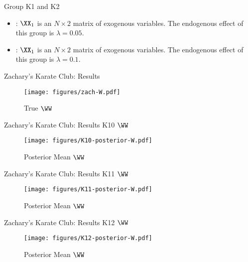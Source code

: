 \documentclass{beamer}
\begin{document}
\begin{frame}{Group K1 and K2}
	\begin{itemize}
		\item{}:
			$\XX_1$ is an $N\times 2$ matrix of exogenous variables.
			The endogenous effect of this group is $\lambda=0.05$.
		\item{}:
			$\XX_1$ is an $N\times 2$ matrix of exogenous variables.
			The endogenous effect of this group is $\lambda=0.1$.
	\end{itemize}
\end{frame}

\begin{frame}{Zachary's Karate Club: Results}
	\begin{figure}[H]
		\centering
		\texttt{[image: figures/zach-W.pdf]}
		\caption{True $\WW$}
	\end{figure}
\end{frame}

\begin{frame}{Zachary's Karate Club: Results K10 $\WW$}
	\begin{figure}[H]
		\centering
		\texttt{[image: figures/K10-posterior-W.pdf]}
		\caption{Posterior Mean $\WW$}
	\end{figure}
\end{frame}

\begin{frame}{Zachary's Karate Club: Results K11 $\WW$}
	\begin{figure}[H]
		\centering
		\texttt{[image: figures/K11-posterior-W.pdf]}
		\caption{Posterior Mean $\WW$}
	\end{figure}
\end{frame}

\begin{frame}{Zachary's Karate Club: Results K12 $\WW$}
	\begin{figure}[H]
		\centering
		\texttt{[image: figures/K12-posterior-W.pdf]}
		\caption{Posterior Mean $\WW$}
	\end{figure}
\end{frame}
\end{document}
